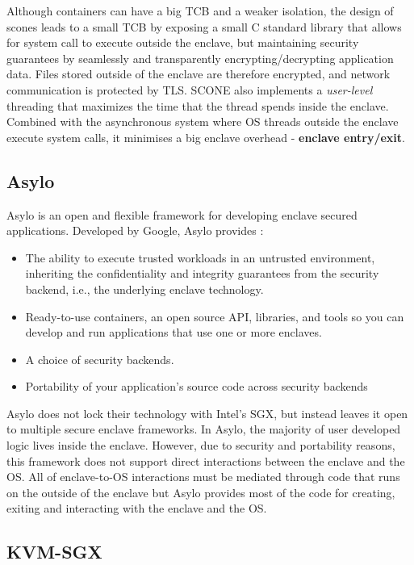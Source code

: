Although containers can have a big \gls{TCB} and a weaker isolation, the design of scones leads to a small \gls{TCB} by exposing a small C standard library that allows for system call to execute outside the enclave, but maintaining security guarantees by seamlessly and transparently encrypting/decrypting application data. Files stored outside of the enclave are therefore encrypted, and network communication is protected by \gls{TLS}. SCONE also implements a \textit{user-level} threading that maximizes the time that the thread spends inside the enclave. Combined with the asynchronous system where OS threads outside the enclave execute system calls, it minimises a big enclave overhead - \textbf{enclave entry/exit}.

\subsection{Asylo}
\label{ssec:asylo}

Asylo \cite{asylo:1} is an open and flexible framework for developing enclave secured applications. Developed by Google, Asylo provides \cite{asylo:2}:

\begin{itemize}
  \item The ability to execute trusted workloads in an untrusted environment, inheriting the confidentiality and integrity guarantees from the security backend, i.e., the underlying enclave technology.
  \item Ready-to-use containers, an open source API, libraries, and tools so you can develop and run applications that use one or more enclaves.
  \item A choice of security backends.
  \item Portability of your application's source code across security backends
\end{itemize}

Asylo does not lock their technology with Intel's \gls{SGX}, but instead leaves it open to multiple secure enclave frameworks. In Asylo, the majority of user developed logic lives inside the enclave. However, due to security and portability reasons, this framework does not support direct interactions between the enclave and the \gls{OS}. All of enclave-to-OS interactions must be mediated through code that runs on the outside of the enclave but Asylo provides most of the code for creating, exiting and interacting with the enclave and the \gls{OS}.

\subsection{KVM-SGX}
\label{ssec:KVM-SGX}



